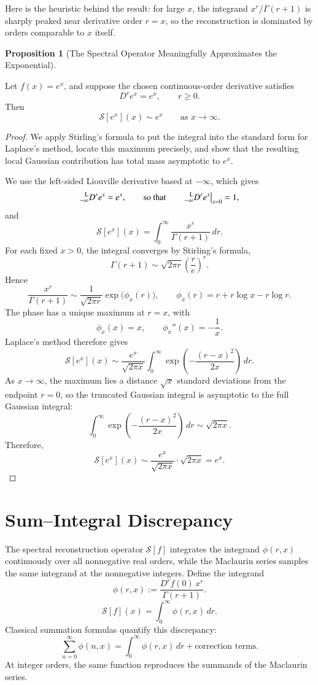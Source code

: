 \documentclass[preprint, 12pt]{elsarticle}
\theoremstyle{definition}
\newtheorem{proposition}[definition]{Proposition}
\theoremstyle{plain}
\theoremstyle{remark}
\begin{document}
Here is the heuristic behind the result: for large $x$, the integrand $x^r/\Gamma(r+1)$ is sharply peaked near derivative order $r=x$, so the reconstruction is dominated by orders comparable to $x$ itself.

\begin{proposition}[The Spectral Operator Meaningfully Approximates the Exponential]
\label{prop:meaningful_approximation_exponential}

Let $f(x)=e^x$, and suppose the chosen continuous-order derivative satisfies
\[
D^r e^x=e^x,
\qquad r\geq 0.
\]
Then
\[
\mathcal S[e^x](x)\sim e^x
\qquad \text{as } x\to\infty.
\]
\end{proposition}

\begin{proof}
We apply Stirling's formula to put the integral into the standard form for Laplace's method, locate this maximum precisely, and show that the resulting local Gaussian contribution has total mass asymptotic to $e^x$.

We use the left-sided Liouville derivative based at $-\infty$, which gives 
\[
\prescript{\mathrm{L}}{-\infty}{D}^{r} e^{x}= e^{x},
\qquad\text{so that}\qquad
\prescript{\mathrm{L}}{-\infty}{D}^{r} e^{x}\big|_{x=0} = 1,
\]
and
\[
\mathcal S[e^x](x)
=
\int_0^\infty \frac{x^r}{\Gamma(r+1)}\,dr.
\]
For each fixed $x>0$, the integral converges by Stirling's formula,
\[
\Gamma(r+1)
\sim
\sqrt{2\pi r}\left(\frac{r}{e}\right)^r.
\]
Hence
\[
\frac{x^r}{\Gamma(r+1)}
\sim
\frac{1}{\sqrt{2\pi r}}
\exp\!\bigl(\phi_x(r)\bigr),
\qquad
\phi_x(r)
=
r+r\log x-r\log r.
\]
The phase has a unique maximum at $r=x$, with
\[
\phi_x(x)=x,
\qquad
\phi_x''(x)=-\frac{1}{x}.
\]
Laplace's method therefore gives
\[
\mathcal S[e^x](x)
\sim
\frac{e^x}{\sqrt{2\pi x}}
\int_0^\infty
\exp\!\left(-\frac{(r-x)^2}{2x}\right)\,dr.
\]
As $x\to\infty$, the maximum lies a distance $\sqrt{x}$ standard deviations from the endpoint $r=0$, so the truncated Gaussian integral is asymptotic to the full Gaussian integral:
\[
\int_0^\infty
\exp\!\left(-\frac{(r-x)^2}{2x}\right)\,dr
\sim
\sqrt{2\pi x}.
\]
Therefore,
\[
\mathcal S[e^x](x)
\sim
\frac{e^x}{\sqrt{2\pi x}}
\cdot
\sqrt{2\pi x}
=
e^x.
\]
\end{proof}
\section{Sum--Integral Discrepancy}
\label{sec:sum_integral_discrepancy}
The spectral reconstruction operator $\mathcal{S}[f]$ integrates the integrand $\phi(r,x)$ continuously over all nonnegative real orders, while the Maclaurin series samples the same integrand at the nonnegative integers. Define the integrand
\[
\phi(r,x)
:=
\frac{D^r f(0)\,x^r}{\Gamma(r+1)}.
\]
\[
\mathcal S[f](x)
=
\int_0^\infty \phi(r,x)\,dr.
\]
Classical summation formulas quantify this discrepancy:
\[
\sum_{n=0}^{\infty} \phi(n,x)
=
\int_0^\infty \phi(r,x)\,dr
+
\text{correction terms}.
\]
At integer orders, the same function reproduces the summands of the Maclaurin series.
\end{document}

